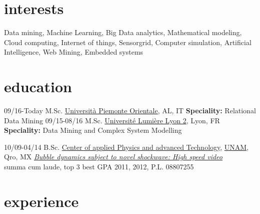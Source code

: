 \documentclass[]{friggeri-cv}
\begin{document}
\section{interests}

Data mining, Machine Learning, Big Data analytics, Mathematical modeling, Cloud computing, Internet of things, Sensorgrid,  Computer simulation,   Artificial Intelligence, Web Mining, Embedded systems

\section{education}

\begin{entrylist}
\entry
{09/16-Today}
{M.Sc. \href{http://www.em-dmkm.eu/}
	{}}
{\href{http://www.uniupo.it/}{Università Piemonte Orientale}, AL, IT}
{\textbf{Speciality:} Relational Data Mining
}
\entry
{09/15-08/16}
{M.Sc. \href{http://www.em-dmkm.eu/}
             {}}
     {\href{http://www.univ-lyon2.fr/}{Université Lumière Lyon 2}, Lyon, FR}
    {\textbf{Speciality:} Data Mining and Complex System Modelling}
    
\entry
{10/09-04/14}
{B.Sc. \href{http://www.fata.unam.mx/tecnologia}
             {}}
  {\href{http://www.fata.unam.mx/}{Center of applied Physics and advanced Technology}, \href{http://www.unam.mx/}{UNAM}, Qro, MX}           
{\href{https://dl.dropboxusercontent.com/u/2115508/Tesis.pdf}{\emph{Bubble dynamics subject to novel shockwave: High speed video}}\\
summa cum laude, top 3 best GPA 2011, 2012, P.L. 08807255
}
\end{entrylist}


\section{experience}
\end{document}
